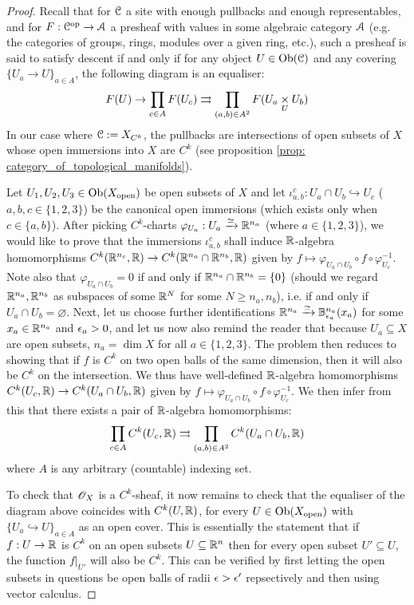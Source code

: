             \begin{proof}
                Recall that for $\mathcal{C}$ a site with enough pullbacks and enough representables, and for $F: \mathcal{C}^{\mathrm{op}} \to \mathcal{A}$ a presheaf with values in some algebraic category $\mathcal{A}$ (e.g. the categories of groups, rings, modules over a given ring, etc.), such a presheaf is said to satisfy descent if and only if for any object $U \in \mathrm{Ob}(\mathcal{C})$ and any covering $\{U_a \to U\}_{a \in A}$, the following diagram is an equaliser:
                    $$F(U) \to \prod_{c \in A} F(U_c) \toto \prod_{(a, b) \in A^2} F(U_a \x_U U_b)$$
                In our case where $\mathcal{C} := X_{C^k}$, the pullbacks are intersections of open subsets of $X$ whose open immersions into $X$ are $C^k$ (see proposition \ref{prop: category_of_topological_manifolds}).
            
                Let $U_1, U_2, U_3 \in \mathrm{Ob}(X_{\mathrm{open}})$ be open subsets of $X$ and let $\iota_{a, b}^c: U_a \cap U_b \hookrightarrow U_c$ ($a, b, c \in \{1, 2, 3\}$) be the canonical open immersions (which exists only when $c \in \{a, b\}$). After picking $C^k$-charts $\varphi_{U_a}: U_a \xrightarrow[]{\simeq} \mathbb{R}^{n_a}$ (where $a \in \{1, 2, 3\}$), we would like to prove that the immersions $\iota_{a, b}^c$ shall induce $\mathbb{R}$-algebra homomorphisms $C^k(\mathbb{R}^{n_c}, \mathbb{R}) \to C^k(\mathbb{R}^{n_a} \cap \mathbb{R}^{n_b}, \mathbb{R})$ given by $f \mapsto \varphi_{U_a \cap U_b} \circ f \circ \varphi_{U_c}^{-1}$. Note also that $\varphi_{U_a \cap U_b} = 0$ if and only if $\mathbb{R}^{n_a} \cap \mathbb{R}^{n_b} = \{0\}$ (should we regard $\mathbb{R}^{n_a}, \mathbb{R}^{n_b}$ as subspaces of some $\mathbb{R}^N$ for some $N \geq n_a, n_b$), i.e. if and only if $U_a \cap U_b = \varnothing$. Next, let us choose further identifications $\mathbb{R}^{n_a} \xrightarrow[]{\simeq} \mathbb{B}^{n_a}_{\epsilon_a}(x_a)$ for some $x_a \in \mathbb{R}^{n_a}$ and $\epsilon_a > 0$, and let us now also remind the reader that because $U_a \subseteq X$ are open subsets, $n_a = \dim X$ for all $a \in \{1, 2 , 3\}$. The problem then reduces to showing that if $f$ is $C^k$ on two open balls of the same dimension, then it will also be $C^k$ on the intersection. We thus have well-defined $\mathbb{R}$-algebra homomorphisms $C^k(U_c, \mathbb{R}) \to C^k(U_a \cap U_b, \mathbb{R})$ given by $f \mapsto \varphi_{U_a \cap U_b} \circ f \circ \varphi_{U_c}^{-1}$. We then infer from this that there exists a pair of $\mathbb{R}$-algebra homomorphisms:
                    $$\prod_{c \in A} C^k(U_c, \mathbb{R}) \rightrightarrows \prod_{(a, b) \in A^2} C^k(U_a \cap U_b, \mathbb{R})$$
                where $A$ is any arbitrary (countable) indexing set.
                
                To check that $\mathscr{O}_X$ is a $C^k$-sheaf, it now remains to check that the equaliser of the diagram above coincides with $C^k(U, \mathbb{R})$, for every $U \in \mathrm{Ob}(X_{\mathrm{open}})$ with $\{U_a \hookrightarrow U\}_{a \in A}$ as an open cover. This is essentially the statement that if $f: U \to \mathbb{R}$ is $C^k$ on an open subsets $U \subseteq \mathbb{R}^n$ then for every open subset $U' \subseteq U$, the function $f|_{U'}$ will also be $C^k$. This can be verified by first letting the open subsets in questions be open balls of radii $\epsilon > \epsilon'$ repsectively and then using vector calculus.
            \end{proof}

